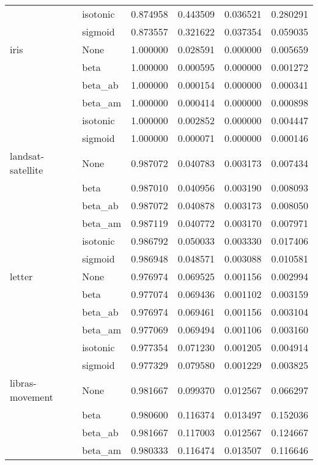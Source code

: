 \begin{tabular}{llrrrr}
        & isotonic &  0.874958 &  0.443509 &  0.036521 &  0.280291 \\
        & sigmoid &  0.873557 &  0.321622 &  0.037354 &  0.059035 \\
iris & None &  1.000000 &  0.028591 &  0.000000 &  0.005659 \\
        & beta &  1.000000 &  0.000595 &  0.000000 &  0.001272 \\
        & beta\_ab &  1.000000 &  0.000154 &  0.000000 &  0.000341 \\
        & beta\_am &  1.000000 &  0.000414 &  0.000000 &  0.000898 \\
        & isotonic &  1.000000 &  0.002852 &  0.000000 &  0.004447 \\
        & sigmoid &  1.000000 &  0.000071 &  0.000000 &  0.000146 \\
landsat-satellite & None &  0.987072 &  0.040783 &  0.003173 &  0.007434 \\
        & beta &  0.987010 &  0.040956 &  0.003190 &  0.008093 \\
        & beta\_ab &  0.987072 &  0.040878 &  0.003173 &  0.008050 \\
        & beta\_am &  0.987119 &  0.040772 &  0.003170 &  0.007971 \\
        & isotonic &  0.986792 &  0.050033 &  0.003330 &  0.017406 \\
        & sigmoid &  0.986948 &  0.048571 &  0.003088 &  0.010581 \\
letter & None &  0.976974 &  0.069525 &  0.001156 &  0.002994 \\
        & beta &  0.977074 &  0.069436 &  0.001102 &  0.003159 \\
        & beta\_ab &  0.976974 &  0.069461 &  0.001156 &  0.003104 \\
        & beta\_am &  0.977069 &  0.069494 &  0.001106 &  0.003160 \\
        & isotonic &  0.977354 &  0.071230 &  0.001205 &  0.004914 \\
        & sigmoid &  0.977329 &  0.079580 &  0.001229 &  0.003825 \\
libras-movement & None &  0.981667 &  0.099370 &  0.012567 &  0.066297 \\
        & beta &  0.980600 &  0.116374 &  0.013497 &  0.152036 \\
        & beta\_ab &  0.981667 &  0.117003 &  0.012567 &  0.124667 \\
        & beta\_am &  0.980333 &  0.116474 &  0.013507 &  0.116646 \\

\end{tabular}
